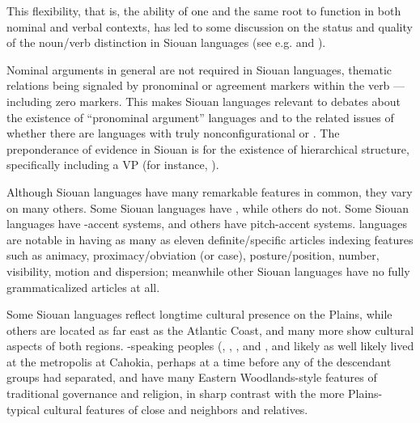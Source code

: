 \begin{refsection}
This flexibility, that is, the ability of one and the same root to function in both nominal and verbal contexts, has led to some discussion on the status and quality of the noun/verb distinction in Siouan languages (see e.g. \citealt{Helmbrecht2002}  and \citet{Ingham2001}). 

Nominal arguments in general are not required in Siouan languages, thematic relations being signaled by pronominal or agreement markers within the verb --- including zero markers. This makes Siouan languages relevant to debates about the existence of ``pronominal argument'' languages \citep{Jelinek1984} and to the related issues of whether there are languages with truly nonconfigurational or . The preponderance of evidence in Siouan is for the existence of hierarchical structure, specifically including a VP (for instance, \citealt{West2003,Johnson2016,JohnsonEtAl2016,Rosen2016}).


Although Siouan languages have many remarkable features in common, they vary on many others.  Some Siouan languages have , while others do not. Some Siouan languages have -accent systems, and others have pitch-accent systems.  languages are notable in having as many as eleven definite/specific articles indexing features such as animacy, proximacy/ob\-viation (or case), posture/position, number, visibility, motion and dispersion; meanwhile other Siouan languages have no fully grammaticalized articles at all.


Some Siouan languages reflect longtime cultural presence on the Plains, while others are located as far east as the Atlantic Coast, and many more show cultural aspects of both regions. -speaking peoples (, , ,  and , and likely  as well \citep{Kasak2016,Koontz1995a} likely lived at the metropolis at Cahokia, perhaps at a time before any of the descendant groups had separated, and have many Eastern Woodlands-style features of traditional governance and religion, in sharp contrast with the more Plains-typical cultural features of close  and  neighbors and relatives.


\end{refsection}
